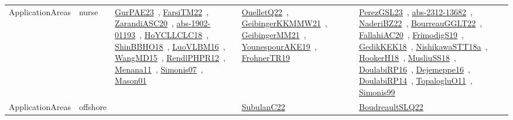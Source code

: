 {\begin{longtable}{lp{3cm}>{\raggedright\arraybackslash}p{6cm}>{\raggedright\arraybackslash}p{6cm}>{\raggedright\arraybackslash}p{8cm}}
ApplicationAreas & nurse & \href{works/GurPAE23.pdf}{GurPAE23}~\cite{GurPAE23}, \href{works/FarsiTM22.pdf}{FarsiTM22}~\cite{FarsiTM22}, \href{works/ZarandiASC20.pdf}{ZarandiASC20}~\cite{ZarandiASC20}, \href{works/abs-1902-01193.pdf}{abs-1902-01193}~\cite{abs-1902-01193}, \href{works/HoYCLLCLC18.pdf}{HoYCLLCLC18}~\cite{HoYCLLCLC18}, \href{works/ShinBBHO18.pdf}{ShinBBHO18}~\cite{ShinBBHO18}, \href{works/LuoVLBM16.pdf}{LuoVLBM16}~\cite{LuoVLBM16}, \href{works/WangMD15.pdf}{WangMD15}~\cite{WangMD15}, \href{works/RendlPHPR12.pdf}{RendlPHPR12}~\cite{RendlPHPR12}, \href{works/Menana11.pdf}{Menana11}~\cite{Menana11}, \href{works/Simonis07.pdf}{Simonis07}~\cite{Simonis07}, \href{works/Mason01.pdf}{Mason01}~\cite{Mason01} & \href{works/OuelletQ22.pdf}{OuelletQ22}~\cite{OuelletQ22}, \href{works/GeibingerKKMMW21.pdf}{GeibingerKKMMW21}~\cite{GeibingerKKMMW21}, \href{works/GeibingerMM21.pdf}{GeibingerMM21}~\cite{GeibingerMM21}, \href{works/YounespourAKE19.pdf}{YounespourAKE19}~\cite{YounespourAKE19}, \href{works/FrohnerTR19.pdf}{FrohnerTR19}~\cite{FrohnerTR19} & \href{works/PerezGSL23.pdf}{PerezGSL23}~\cite{PerezGSL23}, \href{works/abs-2312-13682.pdf}{abs-2312-13682}~\cite{abs-2312-13682}, \href{works/NaderiBZ22.pdf}{NaderiBZ22}~\cite{NaderiBZ22}, \href{works/BourreauGGLT22.pdf}{BourreauGGLT22}~\cite{BourreauGGLT22}, \href{works/FallahiAC20.pdf}{FallahiAC20}~\cite{FallahiAC20}, \href{works/FrimodigS19.pdf}{FrimodigS19}~\cite{FrimodigS19}, \href{works/GedikKEK18.pdf}{GedikKEK18}~\cite{GedikKEK18}, \href{works/NishikawaSTT18a.pdf}{NishikawaSTT18a}~\cite{NishikawaSTT18a}, \href{works/HookerH18.pdf}{HookerH18}~\cite{HookerH18}, \href{works/MusliuSS18.pdf}{MusliuSS18}~\cite{MusliuSS18}, \href{works/DoulabiRP16.pdf}{DoulabiRP16}~\cite{DoulabiRP16}, \href{works/Dejemeppe16.pdf}{Dejemeppe16}~\cite{Dejemeppe16}, \href{works/DoulabiRP14.pdf}{DoulabiRP14}~\cite{DoulabiRP14}, \href{works/TopalogluO11.pdf}{TopalogluO11}~\cite{TopalogluO11}, \href{works/Simonis99.pdf}{Simonis99}~\cite{Simonis99}\\
ApplicationAreas & offshore &  & \href{works/SubulanC22.pdf}{SubulanC22}~\cite{SubulanC22} & \href{works/BoudreaultSLQ22.pdf}{BoudreaultSLQ22}~\cite{BoudreaultSLQ22}\\

\end{longtable}}
